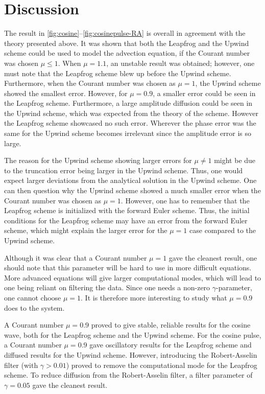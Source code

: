 \section{Discussion}
The result in \autoref{fig:cosine}--\ref{fig:cosinepulse-RA} is overall in agreement with the theory presented above. It was shown that both the Leapfrog and the Upwind scheme could be used to model the advection equation, if the Courant number was chosen $\mu \leq 1$. When $\mu=1.1$, an unstable result was obtained; however, one must note that the Leapfrog scheme blew up before the Upwind scheme. Furthermore, when the Courant number was chosen as $\mu=1$, the Upwind scheme showed the smallest error. However, for $\mu=0.9$, a smaller error could be seen in the Leapfrog scheme. Furthermore, a large amplitude diffusion could be seen in the Upwind scheme, which was expected from the theory of the scheme. However the Leapfrog scheme showcased no such error. Wherever the phase error was the same for the Upwind scheme becomes irrelevant since the amplitude error is so large. 

The reason for the Upwind scheme showing larger errors for $\mu \neq 1$ might be due to the truncation error being larger in the Upwind scheme. Thus, one would expect larger deviations from the analytical solution in the Upwind scheme. One can then question why the Upwind scheme showed a much smaller error when the Courant number was chosen as $\mu=1$. However, one has to remember that the Leapfrog scheme is initialized with the forward Euler scheme. Thus, the initial conditions for the Leapfrog scheme may have an error from the forward Euler scheme, which might explain the larger error for the $\mu=1$ case compared to the Upwind scheme.

Although it was clear that a Courant number $\mu=1$ gave the cleanest result, one should note that this parameter will be hard to use in more difficult equations. More advanced equations will give larger computational modes, which will lead to one being reliant on filtering the data. Since one needs a non-zero $\gamma$-parameter, one cannot choose $\mu=1$. It is therefore more interesting to study what $\mu=0.9$ does to the system.

A Courant number $\mu=0.9$ proved to give stable, reliable results for the cosine wave, both for the Leapfrog scheme and the Upwind scheme. For the cosine pulse, a Courant number $\mu=0.9$ gave oscillatory results for the Leapfrog scheme and diffused results for the Upwind scheme. However, introducing the Robert-Asselin filter (with $\gamma > 0.01$) proved to remove the computational mode for the Leapfrog scheme. To reduce diffusion from the Robert-Asselin filter, a filter parameter of $\gamma=0.05$ gave the cleanest result.